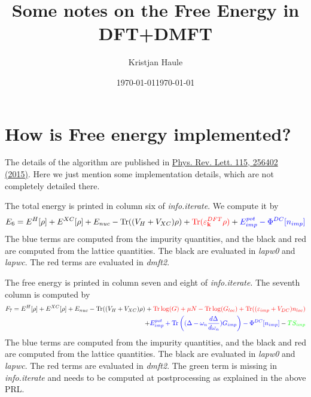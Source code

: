 \documentclass[aps,prb,floatfix,epsfig,singlecolumn,showpacs,preprintnumbers]{revtex4}
\newcommand{\vk}{{\mathbf{k}}}
\newcommand{\Tr}{\mathrm{Tr}}
\begin{document}
\title{Some notes on the Free Energy in DFT+DMFT}
\author{Kristjan Haule}
\date{\today}

\date{\today}
\maketitle

\section{How is Free energy implemented?}

The details of the algorithm are published in 
\href{http://journals.aps.org/prl/abstract/10.1103/PhysRevLett.115.256402}{Phys. Rev. Lett. 115, 256402 (2015)}. 
Here we just mention some implementation details, which are not
completely detailed there.

The total energy is printed in column six of \textit{info.iterate}. We
compute it by
\begin{eqnarray}
E_6=E^H[\rho]+E^{XC}[\rho]+E_{nuc}-\Tr((V_H+V_{XC})\rho)+
\textcolor{red}{\Tr(\varepsilon^{DFT}_\vk \rho)}+
\textcolor{blue}{E_{imp}^{pot}-\Phi^{DC}[n_{imp}]}
\end{eqnarray}
The blue terms are computed from the impurity quantities, and the
black and red
are computed from the lattice quantities. The black are evaluated in \textit{lapw0} and \textit{lapwc}. The red
terms are evaluated in \textit{dmft2}.

The free energy is printed in column seven and eight of
\textit{info.iterate}. The seventh column is computed by
\begin{eqnarray}
F_7=E^H[\rho]+E^{XC}[\rho]+E_{nuc}-\Tr((V_H+V_{XC})\rho)
+\textcolor{red}{\Tr\log( G)+\mu N-\Tr\log(G_{loc})+\Tr((\varepsilon_{imp}+V_{DC})n_{loc})}
\\
+\textcolor{blue}{E_{imp}^{pot}
+\Tr\left((\Delta-\omega_n\frac{d\Delta}{d\omega_n})G_{imp}\right)
-\Phi^{DC}[n_{imp}]}
-\textcolor{green}{T S_{imp}}
\end{eqnarray}
The blue terms are computed from the impurity quantities, and the
black and red
are computed from the lattice quantities. The black are evaluated in \textit{lapw0} and \textit{lapwc}. The red
terms are evaluated in \textit{dmft2}. The green term is missing in
\textit{info.iterate} and needs to be computed at postprocessing as
explained in the above PRL.
\end{document}
